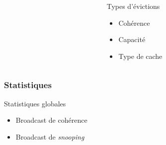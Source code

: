 \begin{frame}[fragile]
\begin{columns}[T]
\begin{column}{.5\textwidth}
    \end{column}
    \begin{column}{.5\textwidth}
      \bigskip
      \begin{block}{Types d'évictions}
	\begin{itemize}
	\item{Cohérence}
        \item{Capacité}
        \item{Type de cache         }
	\end{itemize}
      \end{block}
    \end{column}
  \end{columns}
\end{frame}

\begin{frame}[fragile]
  \frametitle{Statistiques}
  
  \begin{block}{Statistiques globales}
    \begin{itemize}
    \item{Broadcast de cohérence}
    \item{Broadcast de \emph{snooping}}
    \end{itemize}
  \end{block}
  

\end{frame}
